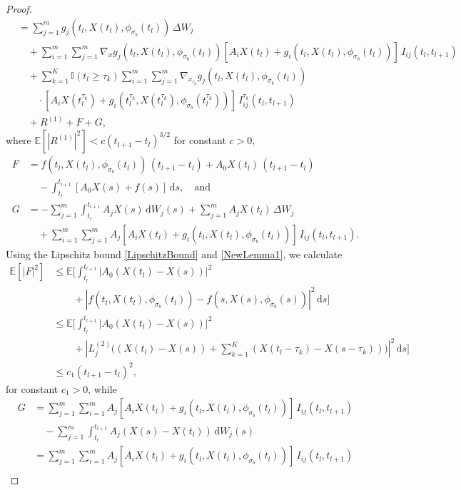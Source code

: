 \documentclass[onefignum]{siamart250211}
\providecommand{\abs}[1]{\left|#1\right|}
\begin{document}
\begin{proof}
\begin{align}
&=\sum_{j=1}^mg_j(t_l,X(t_l),\phi_{\sigma_b}(t_l))\,\Delta W_j\nonumber\\
&\quad+\sum_{i=1}^m\sum_{j=1}^m\nabla_xg_j(t_l,X(t_l),\phi_{\sigma_b}(t_l))[A_iX(t_l)+g_i(t_l,X(t_l),\phi_{\sigma_b}(t_l))]\,I_{ij}(t_l,t_{l+1})\nonumber\\
&\quad+\sum_{k=1}^K\mathbb{I}(t_l\geqslant\tau_k)\sum_{i=1}^m\sum_{j=1}^m\nabla_{x_{\tau_k}}g_j(t_l,X(t_l),\phi_{\sigma_b}(t_l))\nonumber\\
&\quad\quad\cdot[A_iX(t_l^{\tau_k})+g_i(t_l^{\tau_k},X(t_l^{\tau_k}),\phi_{\sigma_b}(t_l^{\tau_k}))]\,I_{ij}^{\tau_k}(t_l,t_{l+1})\nonumber\\
&\quad+R^{(1)}+F+G,\nonumber
\end{align}
where $\mathbb{E}[\abs{R^{(1)}}^2]<c(t_{l+1}-t_l)^{3/2}$ for constant $c>0$,
\begin{align*}
F&=f(t_l,X(t_l),\phi_{\sigma_b}(t_l))\,(t_{l+1}-t_l)+A_0X(t_l)\,(t_{l+1}-t_l)\\
&\quad-\int_{t_l}^{t_{l+1}}[A_0X(s)+f(s)]\,\mathrm{d}s,\quad\textrm{and}\\
G&=-\sum_{j=1}^m\int_{t_l}^{t_{l+1}}A_jX(s)\,\mathrm{d}W_j(s)+\sum_{j=1}^mA_jX(t_l)\,\Delta W_j\nonumber\\
&\quad+\sum_{i=1}^m\sum_{j=1}^mA_j[A_iX(t_l)+g_i(t_l,X(t_l),\phi_{\sigma_b}(t_l))]\,I_{ij}(t_l,t_{l+1}).
\end{align*}
Using the Lipschitz bound \cref{LipschitzBound} and \cref{NewLemma1}, we calculate
\begin{align*}
\mathbb{E}\left[\abs{F}^2\right]&\leqslant\mathbb{E}\bigg[\int_{t_l}^{t_{l+1}}\abs{A_0(X(t_l)-X(s))}^2\\
&\quad\quad+\abs{f(t_l,X(t_l),\phi_{\sigma_b}(t_l))-f(s,X(s),\phi_{\sigma_b}(s))}^2\,\mathrm{d}s\bigg]\\
&\leqslant\mathbb{E}\bigg[\int_{t_l}^{t_{l+1}}\abs{A_0(X(t_l)-X(s))}^2\\
&\quad\quad+\abs{L_j^{(2)}\bigg((X(t_l)-X(s))+\sum_{k=1}^K(X(t_l-\tau_k)-X(s-\tau_k))\bigg)}^2\,\mathrm{d}s\bigg]\\
&\leqslant c_1(t_{l+1}-t_l)^2,
\end{align*}
for constant $c_1>0$, while
\begin{align*}
G&=\sum_{j=1}^m\sum_{i=1}^mA_j[A_iX(t_l)+g_i(t_l,X(t_l),\phi_{\sigma_b}(t_l))]\,I_{ij}(t_l,t_{l+1})\\
&\quad-\sum_{j=1}^m\int_{t_l}^{t_{l+1}}A_j(X(s)-X(t_l))\,\mathrm{d}W_j(s)\\
&=\sum_{j=1}^m\sum_{i=1}^mA_j[A_iX(t_l)+g_i(t_l,X(t_l),\phi_{\sigma_b}(t_l))]\,I_{ij}(t_l,t_{l+1})\\

\end{align*}
\end{proof}
\end{document}
